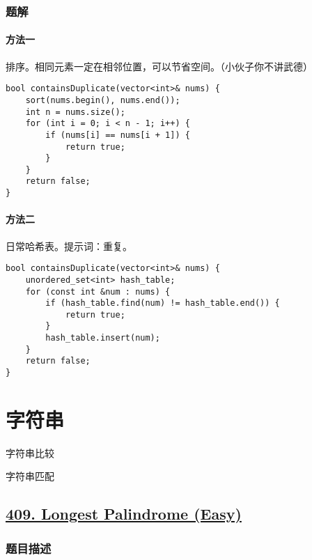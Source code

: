 \documentclass[lang=cn,10pt]{elegantbook}
\begin{document}
\subsection*{题解}

\subsubsection*{方法一}

排序。相同元素一定在相邻位置，可以节省空间。（小伙子你不讲武德）

\begin{lstlisting}
bool containsDuplicate(vector<int>& nums) {
	sort(nums.begin(), nums.end());
	int n = nums.size();
	for (int i = 0; i < n - 1; i++) {
		if (nums[i] == nums[i + 1]) {
			return true;
		}
	}
	return false;
}
\end{lstlisting}

\subsubsection*{方法二}

日常哈希表。提示词：重复。

\begin{lstlisting}
bool containsDuplicate(vector<int>& nums) {
	unordered_set<int> hash_table;
	for (const int &num : nums) {
		if (hash_table.find(num) != hash_table.end()) {
			return true;
		}
		hash_table.insert(num);
	}
	return false;
}
\end{lstlisting}

\chapter{字符串}

\begin{introduction}[前情提要]
	\item 字符串比较
	\item 字符串匹配
\end{introduction}

{\color{red}\section{\href{https://leetcode.cn/problems/longest-palindrome/}{409. Longest Palindrome (Easy)}}} \label{ch12.409}

\subsection*{题目描述}
\end{document}
